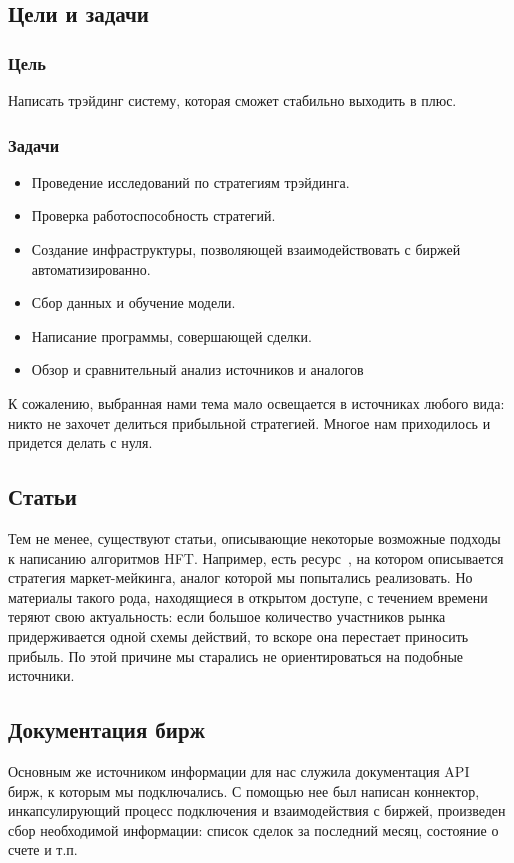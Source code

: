 \documentclass{article}
\begin{document}
\subsection{Цели и задачи}
\subsubsection{Цель}
Написать трэйдинг систему, которая сможет стабильно выходить в плюс.
\subsubsection{Задачи}
\begin{itemize}
\item Проведение исследований по стратегиям трэйдинга.
\item Проверка работоспособность стратегий.
\item Создание инфраструктуры, позволяющей взаимодействовать с биржей автоматизированно.
\item Сбор данных и обучение модели.
\item Написание программы, совершающей сделки.
\item Обзор и сравнительный анализ источников и аналогов
\end{itemize}
К сожалению, выбранная нами тема мало освещается в источниках любого вида: никто не захочет делиться прибыльной стратегией. Многое нам приходилось и придется делать с нуля.
\subsection{Статьи}
Тем не менее, существуют статьи, описывающие некоторые возможные подходы к написанию алгоритмов HFT. Например, есть ресурс~\cite{HftBattle}, на котором описывается стратегия маркет-мейкинга, аналог которой мы попытались реализовать. Но материалы такого рода, находящиеся в открытом доступе, с течением времени теряют свою актуальность: если большое количество участников рынка придерживается одной схемы действий, то вскоре она перестает приносить прибыль. По этой причине мы старались не ориентироваться на подобные источники.
\subsection{Документация бирж}
Основным же источником информации для нас служила документация API~\cite{DydxDocs}~\cite{BinanceDocs} бирж, к которым мы подключались. С помощью нее был написан коннектор, инкапсулирующий процесс подключения и взаимодействия с биржей, произведен сбор необходимой информации: список сделок за последний месяц, состояние о счете и т.п.
\end{document}
